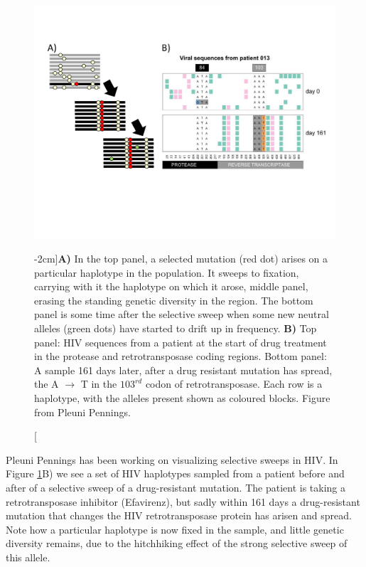 \begin{figure}
\begin{center}
\includegraphics[width= \textwidth]{Journal_figs/recom_selection/Pleuni_HIV_sweep/HIV_no_recom_sweep.pdf}
\end{center}
\caption[][-2cm]{{\bf A)} In the top panel, a selected mutation (red dot) arises
on a particular haplotype in the population. It sweeps to fixation,
carrying with it the haplotype on which it arose, middle panel,
erasing the standing genetic diversity in the region. The bottom panel
is some time after the selective sweep when some new neutral alleles (green
dots) have started to drift up in frequency. {\bf B)}  Top panel: HIV
sequences from a patient at the start of drug treatment in the
protease and retrotransposase coding regions. Bottom panel: A sample
161 days later, after a drug resistant mutation has spread, the A
$\rightarrow$ T in the $103^{rd}$ codon of retrotransposase. Each row is a haplotype,
with the alleles present shown as coloured blocks. Figure from Pleuni Pennings.} \label{fig:HIV_sweep}  %
\end{figure}

Pleuni Pennings has been working on visualizing selective sweeps in
HIV. In Figure \ref{fig:HIV_sweep}B) we see a set of HIV haplotypes
sampled from a patient before and after of a selective sweep of a
drug-resistant mutation. The patient is taking a
retrotransposase inhibitor (Efavirenz), but sadly within 161 days a
drug-resistant mutation that changes the HIV retrotransposase protein has arisen and spread. Note how a particular haplotype is now fixed in
the sample, and little genetic diversity remains, due to the
hitchhiking effect of the strong
selective sweep of this allele. 


